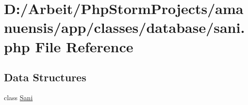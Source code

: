 \hypertarget{a00089}{}\section{D\+:/\+Arbeit/\+Php\+Storm\+Projects/amanuensis/app/classes/database/sani.php File Reference}
\label{a00089}
\subsection*{Data Structures}
\begin{DoxyCompactItemize}
\item 
class \hyperlink{a00040}{Sani}
\end{DoxyCompactItemize}

